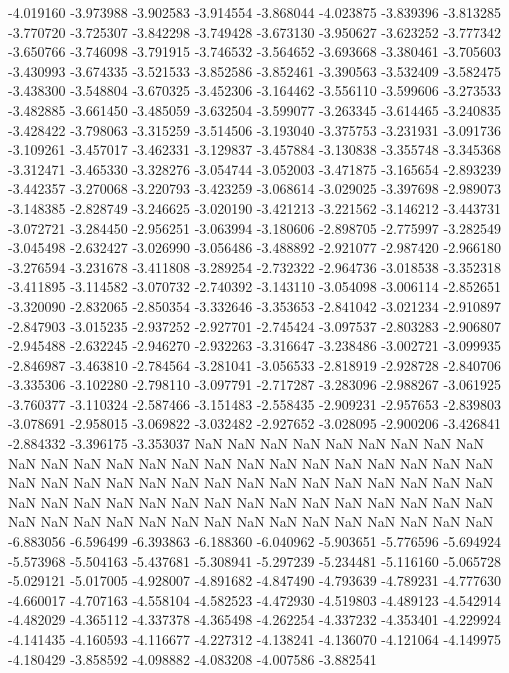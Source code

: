 -4.019160
-3.973988
-3.902583
-3.914554
-3.868044
-4.023875
-3.839396
-3.813285
-3.770720
-3.725307
-3.842298
-3.749428
-3.673130
-3.950627
-3.623252
-3.777342
-3.650766
-3.746098
-3.791915
-3.746532
-3.564652
-3.693668
-3.380461
-3.705603
-3.430993
-3.674335
-3.521533
-3.852586
-3.852461
-3.390563
-3.532409
-3.582475
-3.438300
-3.548804
-3.670325
-3.452306
-3.164462
-3.556110
-3.599606
-3.273533
-3.482885
-3.661450
-3.485059
-3.632504
-3.599077
-3.263345
-3.614465
-3.240835
-3.428422
-3.798063
-3.315259
-3.514506
-3.193040
-3.375753
-3.231931
-3.091736
-3.109261
-3.457017
-3.462331
-3.129837
-3.457884
-3.130838
-3.355748
-3.345368
-3.312471
-3.465330
-3.328276
-3.054744
-3.052003
-3.471875
-3.165654
-2.893239
-3.442357
-3.270068
-3.220793
-3.423259
-3.068614
-3.029025
-3.397698
-2.989073
-3.148385
-2.828749
-3.246625
-3.020190
-3.421213
-3.221562
-3.146212
-3.443731
-3.072721
-3.284450
-2.956251
-3.063994
-3.180606
-2.898705
-2.775997
-3.282549
-3.045498
-2.632427
-3.026990
-3.056486
-3.488892
-2.921077
-2.987420
-2.966180
-3.276594
-3.231678
-3.411808
-3.289254
-2.732322
-2.964736
-3.018538
-3.352318
-3.411895
-3.114582
-3.070732
-2.740392
-3.143110
-3.054098
-3.006114
-2.852651
-3.320090
-2.832065
-2.850354
-3.332646
-3.353653
-2.841042
-3.021234
-2.910897
-2.847903
-3.015235
-2.937252
-2.927701
-2.745424
-3.097537
-2.803283
-2.906807
-2.945488
-2.632245
-2.946270
-2.932263
-3.316647
-3.238486
-3.002721
-3.099935
-2.846987
-3.463810
-2.784564
-3.281041
-3.056533
-2.818919
-2.928728
-2.840706
-3.335306
-3.102280
-2.798110
-3.097791
-2.717287
-3.283096
-2.988267
-3.061925
-3.760377
-3.110324
-2.587466
-3.151483
-2.558435
-2.909231
-2.957653
-2.839803
-3.078691
-2.958015
-3.069822
-3.032482
-2.927652
-3.028095
-2.900206
-3.426841
-2.884332
-3.396175
-3.353037
NaN
NaN
NaN
NaN
NaN
NaN
NaN
NaN
NaN
NaN
NaN
NaN
NaN
NaN
NaN
NaN
NaN
NaN
NaN
NaN
NaN
NaN
NaN
NaN
NaN
NaN
NaN
NaN
NaN
NaN
NaN
NaN
NaN
NaN
NaN
NaN
NaN
NaN
NaN
NaN
NaN
NaN
NaN
NaN
NaN
NaN
NaN
NaN
NaN
NaN
NaN
NaN
NaN
NaN
NaN
NaN
NaN
NaN
NaN
NaN
NaN
NaN
NaN
NaN
NaN
NaN
NaN
NaN
NaN
-6.883056
-6.596499
-6.393863
-6.188360
-6.040962
-5.903651
-5.776596
-5.694924
-5.573968
-5.504163
-5.437681
-5.308941
-5.297239
-5.234481
-5.116160
-5.065728
-5.029121
-5.017005
-4.928007
-4.891682
-4.847490
-4.793639
-4.789231
-4.777630
-4.660017
-4.707163
-4.558104
-4.582523
-4.472930
-4.519803
-4.489123
-4.542914
-4.482029
-4.365112
-4.337378
-4.365498
-4.262254
-4.337232
-4.353401
-4.229924
-4.141435
-4.160593
-4.116677
-4.227312
-4.138241
-4.136070
-4.121064
-4.149975
-4.180429
-3.858592
-4.098882
-4.083208
-4.007586
-3.882541
